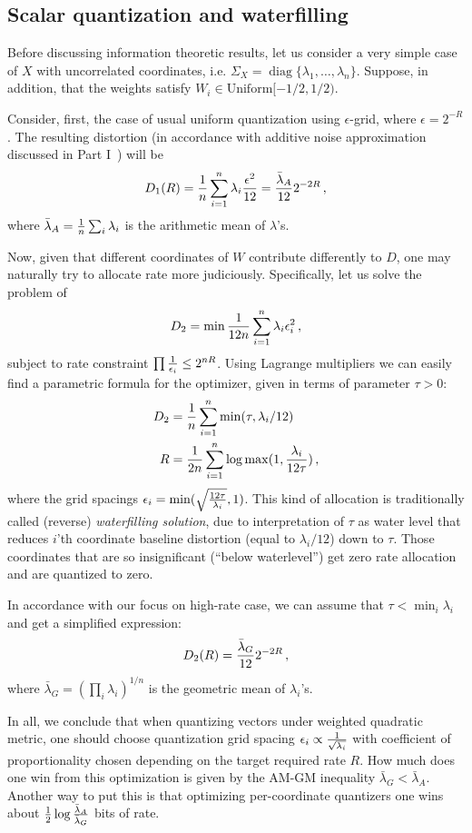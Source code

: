 \documentclass[journal]{IEEEtran}
\newcommand{\diag}{\mathop{\mathrm{diag}}}
\newcommand{\Unif}{\mathrm{Uniform}}
\begin{document}
\subsection{Scalar quantization and waterfilling}

Before discussing information theoretic results, let us consider a very simple case of $X$ with
uncorrelated coordinates, i.e. $\Sigma_X = \diag\{\lambda_1,\ldots,\lambda_n\}$. Suppose, in
addition, that the weights satisfy $W_i\in\Unif[-1/2,1/2)$.

Consider, first, the case of usual uniform quantization using $\epsilon$-grid, where
$\epsilon=2^{-R}$. The resulting distortion (in accordance with additive noise approximation discussed in Part I~\cite{OP26part1}) will be
$$ D_{1}(R) = {1\over n}\sum_{i=1}^n \lambda_i {\epsilon^2\over 12} = {\bar \lambda_{A}\over 12}
2^{-2R}\,,$$
where $\bar \lambda_A = {1\over n} \sum_{i} \lambda_i$ is the arithmetic mean of $\lambda$'s.

Now, given that different coordinates of $W$ contribute differently to $D$, one may naturally try
to allocate rate more judiciously. Specifically, let us solve the problem of
$$ D_2 = \min {1\over 12n} \sum_{i=1}^n \lambda_i \epsilon_i^2\,,$$
subject to rate constraint $\prod {1\over \epsilon_i} \le 2^{nR}$. Using Lagrange multipliers we
can easily find a parametric formula for the optimizer, given in terms of parameter $\tau > 0$:
\begin{align*} D_2 &= {1\over n} \sum_{i=1}^n \min(\tau, \lambda_i/12)\\
   R &= {1\over 2n} \sum_{i=1}^n \log \max(1, {\lambda_i\over 12\tau})\,,
\end{align*}
where the grid spacings $\epsilon_i = \min(\sqrt{12\tau\over \lambda_i}, 1)$.
This kind of allocation is traditionally called (reverse) \emph{waterfilling solution}, due to
interpretation of $\tau$ as water level that reduces $i$'th coordinate baseline
distortion (equal to $\lambda_i/12$) down to $\tau$. Those coordinates that are so insignificant
(``below waterlevel'') get zero rate allocation and are quantized to zero. 

In accordance with our focus on high-rate case, we can assume that $\tau < \min_i \lambda_i$ and get
a simplified expression:
$$ D_2(R) =  {\bar \lambda_G\over 12} 2^{-2R}\,,$$
where $\bar \lambda_G = (\prod_i \lambda_i)^{1/n}$ is the geometric mean of $\lambda_i$'s. 

In all, we conclude that when quantizing vectors under weighted quadratic metric, one should
choose quantization grid spacing $\epsilon_i \propto {1\over \sqrt{\lambda_i}}$ with coefficient
of proportionality chosen depending on the target required rate $R$. How much does one win from
this optimization is given by the AM-GM inequality $\bar \lambda_G < \bar \lambda_A$. Another way
to put this is that optimizing per-coordinate quantizers one wins about ${1\over 2} \log {\bar \lambda_A\over \bar \lambda_G}$ bits of rate. 
\end{document}
